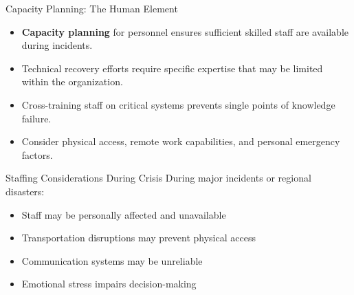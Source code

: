 \documentclass{beamer}
\begin{document}
\begin{frame}{Capacity Planning: The Human Element}
    \begin{itemize}
        \item \textbf{Capacity planning} for personnel ensures sufficient skilled staff are available during incidents.
        \item Technical recovery efforts require specific expertise that may be limited within the organization.
        \item Cross-training staff on critical systems prevents single points of knowledge failure.
        \item Consider physical access, remote work capabilities, and personal emergency factors.
    \end{itemize}
    
    \begin{alertblock}{Staffing Considerations During Crisis}
        During major incidents or regional disasters:
        \small
        \begin{itemize}
            \item Staff may be personally affected and unavailable
            \item Transportation disruptions may prevent physical access
            \item Communication systems may be unreliable
            \item Emotional stress impairs decision-making
        \end{itemize}
    \end{alertblock}
\end{frame}
\end{document}
